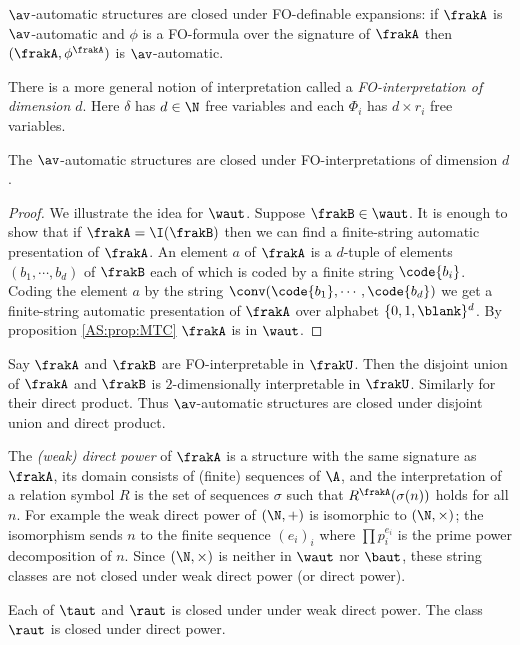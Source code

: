 \begin{example}
$\av$-automatic structures are closed under FO-definable expansions: if $\frakA$ is $\av$-automatic and $\phi$ is a FO-formula over the signature of $\frakA$ then $(\frakA,\phi^\frakA)$ is $\av$-automatic.
\end{example}

There is a more general notion of interpretation called a {\em FO-interpretation of dimension $d$}.
Here $\delta$ has $d \in \N$ free variables and each $\Phi_i$ has $d\times r_i$ free variables.

\begin{proposition} \cite{BlGr00}
The $\av$-automatic structures are closed under  FO-interpretations of dimension $d$.
\end{proposition}

\begin{proof}
We illustrate the idea for $\waut$. Suppose $\frakB \in \waut$. It is enough to show that if $\frakA = \I(\frakB)$ then we can find a finite-string automatic presentation of $\frakA$. 
An element $a$ of $\frakA$ is a $d$-tuple of elements $(b_1,\cdots,b_d)$ of $\frakB$ each of which is coded by a finite string 
$\code{b_i}$. Coding the element $a$ by the string $\conv(\code{b_1},\cdots,\code{b_d})$ we get a finite-string automatic presentation of $\frakA$ over alphabet 
$\{0,1,\blank\}^d$. By proposition \ref{AS:prop:MTC} $\frakA$ is in $\waut$.
\end{proof}


Say $\frakA$ and $\frakB$ are FO-interpretable in $\frakU$. Then the disjoint union of $\frakA$ and $\frakB$ is $2$-dimensionally interpretable in $\frakU$. Similarly for their direct product.
Thus $\av$-automatic structures are closed under disjoint union and direct product.

The {\em (weak) direct power} of $\frakA$ is a structure with the same signature as $\frakA$, its domain consists 
of (finite) sequences of $\A$, and the 
interpretation of a relation symbol $R$ is the set of sequences $\sigma$ such that $R^\frakA(\sigma(n))$ holds for all $n$.
For example the weak direct power of $(\N,+)$ is isomorphic to $(\N,\times)$; the isomorphism sends $n$ to  the finite sequence $(e_i)_i$ where
$ \prod p_i^{e_i}$ is the prime power decomposition of $n$. Since $(\N,\times)$ is neither in $\waut$ nor $\baut$, these string classes are not closed under weak direct power (or direct power).
 
\begin{proposition} \label{AS:prop:powerclosure} \cite{Blum99}
Each of  $\taut$ and $\raut$ is closed under under weak direct power. The class $\raut$ is closed under direct power.
\end{proposition}

